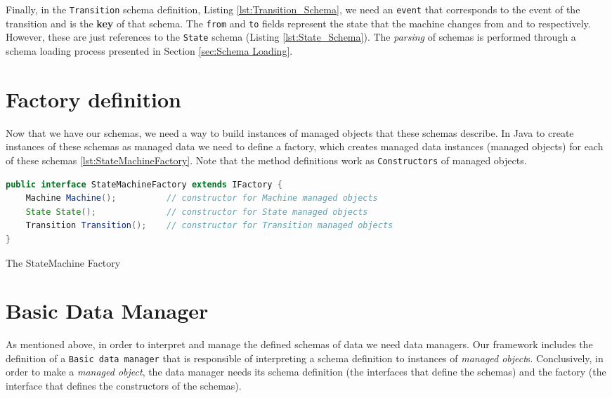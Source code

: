 Finally, in the \texttt{Transition} schema definition, Listing \ref{lst:Transition_Schema}, we need an \texttt{event} that corresponds to the event of the transition and is the \textbf{key} of that schema.
The \texttt{from} and \texttt{to} fields represent the state that the machine changes from and to respectively.
However, these are just references to the \texttt{State} schema (Listing \ref{lst:State_Schema}).
The \textit{parsing} of schemas is performed through a schema loading process presented in Section \ref{sec:Schema Loading}.

\section{Factory definition}
Now that we have our schemas, we need a way to build instances of managed objects that these schemas describe. 
In Java to create instances of these schemas as managed data we need to define a factory, which creates managed data instances (managed objects) for each of these schemas \ref{lst:StateMachineFactory}.
Note that the method definitions work as \texttt{Constructors} of managed objects.

\begin{sourcecode}[H]
	\begin{lstlisting}[language=Java,escapechar=|]
public interface StateMachineFactory extends IFactory {
	Machine Machine();  		// constructor for Machine managed objects
	State State(); 				// constructor for State managed objects
	Transition Transition(); 	// constructor for Transition managed objects
}
	\end{lstlisting}
	\caption{The StateMachine Factory}
	\label{lst:StateMachineFactory}
\end{sourcecode}

\section{Basic Data Manager}
As mentioned above, in order to interpret and manage the defined schemas of data we need data managers. 
Our framework includes the definition of a \texttt{Basic data manager} that is responsible of interpreting a schema definition to instances of \textit{managed object}s.
Conclusively, in order to make a \textit{managed object}, the data manager needs its schema definition (the interfaces that define the schemas) and the factory (the interface that defines the constructors of the schemas).

